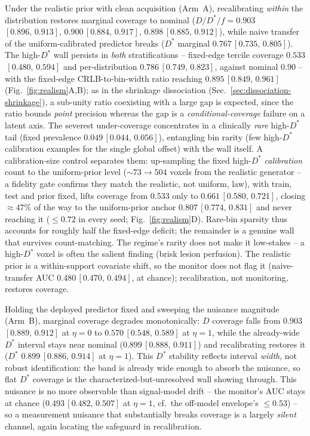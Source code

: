 \documentclass[11pt]{article}
\newcommand{\Dstar}{D^{*}}
\newcommand{\band}[2]{{\scriptsize\,$[#1,\,#2]$}}
\begin{document}
Under the realistic prior with clean acquisition (Arm~A), recalibrating
\emph{within} the distribution restores marginal coverage to nominal ($D/\Dstar/f =
0.903$\band{0.896}{0.913}, $0.900$\band{0.884}{0.917}, $0.898$\band{0.885}{0.912}),
while naive transfer of the uniform-calibrated predictor breaks ($\Dstar$ marginal
$0.767$\band{0.735}{0.805}). The high-$\Dstar$ wall persists in \emph{both}
stratifications -- fixed-edge tercile coverage $0.533$\band{0.480}{0.594} and
per-distribution $0.786$\band{0.749}{0.823}, against nominal $0.90$ -- with the
fixed-edge CRLB-to-bin-width ratio reaching $0.895$\band{0.849}{0.961}
(Fig.~\ref{fig:realism}A,B); as in the shrinkage dissociation
(Sec.~\ref{sec:dissociation-shrinkage}), a sub-unity ratio coexisting with a large gap
is expected, since the ratio bounds \emph{point} precision whereas the gap is a
\emph{conditional-coverage} failure on a latent axis. The severest under-coverage
concentrates in a clinically \emph{rare} high-$\Dstar$ tail (fixed prevalence
$0.049$\band{0.044}{0.056}), entangling bin rarity (few high-$\Dstar$ calibration
examples for the single global offset) with the wall itself. A calibration-size
control separates them: up-sampling the fixed high-$\Dstar$ \emph{calibration} count
to the uniform-prior level ($\sim\!73\to504$ voxels from the realistic generator -- a
fidelity gate confirms they match the realistic, not uniform, law), with train, test
and prior fixed, lifts coverage from $0.533$ only to $0.661$\band{0.580}{0.721},
closing $\approx\!47\%$ of
the way to the uniform-prior anchor $0.807$\band{0.774}{0.831} and never reaching it
($\le0.72$ in every seed; Fig.~\ref{fig:realism}D). Rare-bin sparsity thus accounts
for roughly half the fixed-edge deficit; the remainder is a genuine wall that survives
count-matching. The regime's rarity does not make it low-stakes -- a high-$\Dstar$
voxel is often the salient finding (brisk lesion perfusion). The realistic prior is a
within-support covariate shift, so the monitor does not flag it (naive-transfer AUC
$0.480$\band{0.470}{0.494}, at chance); recalibration, not monitoring, restores
coverage.

Holding the deployed predictor fixed and sweeping the nuisance magnitude (Arm~B),
marginal coverage degrades monotonically: $D$ coverage falls from
$0.903$\band{0.889}{0.912} at $\eta=0$ to $0.570$\band{0.548}{0.589} at $\eta=1$,
while the already-wide $\Dstar$ interval stays near nominal
($0.899$\band{0.888}{0.911}) and recalibrating restores it ($\Dstar$
$0.899$\band{0.886}{0.914} at $\eta=1$). This $\Dstar$ stability reflects interval
\emph{width}, not robust identification: the band is already wide enough to absorb the
nuisance, so flat $\Dstar$ coverage is the characterized-but-unresolved wall showing
through. This nuisance is no more observable than signal-model drift -- the monitor's
AUC stays at chance ($0.493$\band{0.482}{0.507} at $\eta=1$, cf.\ the off-model
envelope's $\le0.53$) -- so a measurement nuisance that substantially breaks coverage
is a largely \emph{silent} channel, again locating the safeguard in recalibration.
\end{document}
